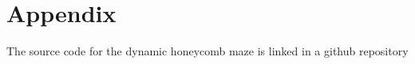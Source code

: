 \section{Appendix}

The source code for the dynamic honeycomb maze is linked in a github repository \cite{honeycombmazegithub}
